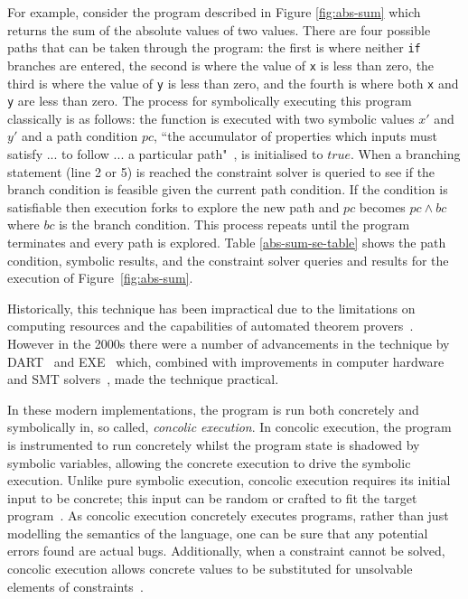 \documentclass[]{final_report}
\begin{document}
For example, consider the program described in Figure \ref{fig:abs-sum} which returns the sum of the absolute values of two values. There are four possible paths that can be taken through the program: the first is where neither \lstinline|if| branches are entered, the second is where the value of \lstinline|x| is less than zero, the third is where the value of \lstinline|y| is less than zero, and the fourth is where both \lstinline|x| and \lstinline|y| are less than zero. The process for symbolically executing this program classically is as follows: the function is executed with two symbolic values $x'$ and $y'$ and a path condition $pc$, ``the accumulator of properties which inputs must satisfy ... to follow ... a particular path"~\cite{king1976symbolic}, is initialised to $true$. When a branching statement (line 2 or 5) is reached the constraint solver is queried to see if the branch condition is feasible given the current path condition. If the condition is satisfiable then execution forks to explore the new path and $pc$ becomes $pc \land bc$ where $bc$ is the branch condition. This process repeats until the program terminates and every path is explored. Table \ref{abs-sum-se-table} shows the path condition, symbolic results, and the constraint solver queries and results for the execution of Figure~\ref{fig:abs-sum}.

Historically, this technique has been impractical due to the limitations on computing resources and the capabilities of automated theorem provers~\cite{king1976symbolic}. However in the 2000s there were a number of advancements in the technique by DART~\cite{godefroid2005dart} and EXE~\cite{cadar2008exe} which, combined with improvements in computer hardware and SMT solvers~\cite{de2011satisfiability}, made the technique practical.

In these modern implementations, the program is run both concretely and symbolically in, so called, \textit{concolic execution}. In concolic execution, the program is instrumented to run concretely whilst the program state is shadowed by symbolic variables, allowing the concrete execution to drive the symbolic execution. Unlike pure symbolic execution, concolic execution requires its initial input to be concrete; this input can be random or crafted to fit the target program~\cite{godefroid2008grammar,cadar2013symbolic}. As concolic execution concretely executes programs, rather than just modelling the semantics of the language, one can be sure that any potential errors found are actual bugs. Additionally, when a constraint cannot be solved, concolic execution allows concrete values to be substituted for unsolvable elements of constraints~\cite{sen2007concolic,sen2005cute}.
\end{document}
